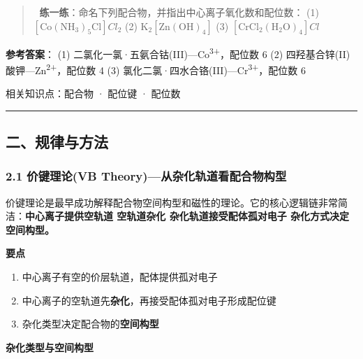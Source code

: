 \begin{quote}
📝 \textbf{练一练}：命名下列配合物，并指出中心离子氧化数和配位数：
(1) \([\mathrm{Co(NH_3)_5Cl}]Cl_2\)
(2) \(\mathrm{K_2[Zn(OH)_4]}\)
(3) \([\mathrm{CrCl_2(H_2O)_4}]Cl\)
\end{quote}

\textbf{参考答案}：
(1) 二氯化一氯·五氨合钴(III)---Co\textsuperscript{3+}，配位数 6
(2) 四羟基合锌(II)酸钾---Zn\textsuperscript{2+}，配位数 4
(3) 氯化二氯·四水合铬(III)---Cr\textsuperscript{3+}，配位数 6

相关知识点：配合物 · 配位键 · 配位数

\begin{center}\rule{0.5\linewidth}{0.5pt}\end{center}

\subsection{二、规律与方法}\label{ux4e8cux89c4ux5f8bux4e0eux65b9ux6cd5}

\subsubsection{2.1 价键理论(VB Theory)---从杂化轨道看配合物构型}\label{ux4ef7ux952eux7406ux8bbavb-theoryux4eceux6742ux5316ux8f68ux9053ux770bux914dux5408ux7269ux6784ux578b}

价键理论是最早成功解释配合物空间构型和磁性的理论。它的核心逻辑链非常简洁：\textbf{中心离子提供空轨道 \箭 空轨道杂化 \箭 杂化轨道接受配体孤对电子 \箭 杂化方式决定空间构型。}

\textbf{要点}

\begin{enumerate}
\def\labelenumi{\arabic{enumi}.}
\tightlist
\item
  中心离子有空的价层轨道，配体提供孤对电子
\item
  中心离子的空轨道先\textbf{杂化}，再接受配体孤对电子形成配位键
\item
  杂化类型决定配合物的\textbf{空间构型}
\end{enumerate}

\textbf{杂化类型与空间构型}

